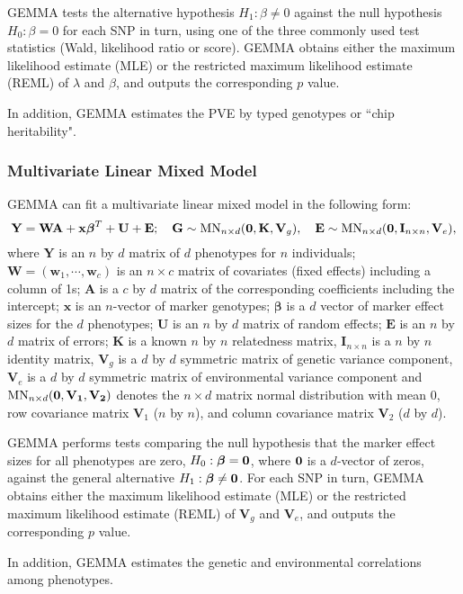 \documentclass[11pt]{article}
\newcommand{\bx}{\mathbf{x}}
\newcommand{\bw}{\mathbf{w}}
\newcommand{\bK}{\mathbf{K}}
\newcommand{\bV}{\mathbf{V}}
\newcommand{\bA}{\mathbf{A}}
\newcommand{\bY}{\mathbf{Y}}
\newcommand{\bE}{\mathbf{E}}
\newcommand{\bG}{\mathbf{G}}
\newcommand{\bW}{\mathbf{W}}
\newcommand{\bU}{\mathbf{U}}
\newcommand{\bI}{\mathbf{I}}
\newcommand{\bbeta}{\boldsymbol\beta}
\begin{document}
GEMMA tests the alternative hypothesis $H_1: \beta\neq 0$ against the null hypothesis $H_0: \beta=0$ for each SNP in turn, using one of the three commonly used test statistics (Wald, likelihood ratio or score). GEMMA obtains either the maximum likelihood estimate (MLE) or the restricted maximum likelihood estimate (REML) of $\lambda$ and $\beta$, and outputs the corresponding $p$ value.

In addition, GEMMA estimates the PVE by typed genotypes or ``chip heritability".


\subsubsection{Multivariate Linear Mixed Model}
GEMMA can fit a multivariate linear mixed model in the following form:
%
\begin{equation*}
\bY=\bW \bA+\bx\bbeta^T+\bU+\bE;  \quad  \bG \sim \mbox{MN}_{n \times d}({\bf 0}, \bK, \bV_g), \quad \bE \sim \mbox{MN}_{n \times d}({\bf 0}, \bI_{n\times n}, \bV_e),
\end{equation*}
%
where $\bY$ is an $n$ by $d$ matrix of $d$ phenotypes for $n$ individuals; $\bW=(\bw_1, \cdots, \bw_c)$ is an $n\times c$ matrix of covariates (fixed effects) including a column of 1s; $\bA$ is a $c$ by $d$ matrix of the corresponding coefficients including the intercept; $\bx$ is an $n$-vector of marker genotypes; $\bbeta$ is a $d$ vector of marker effect sizes for the $d$ phenotypes; $\bU$ is an $n$ by $d$ matrix of random effects; $\bE$ is an $n$ by $d$ matrix of errors; $\bK$ is a known $n$ by $n$ relatedness matrix, $\bI_{n\times n}$ is a $n$ by $n$ identity matrix, $\bV_g$ is a $d$ by $d$  symmetric matrix of genetic variance component, $\bV_e$ is a $d$ by $d$  symmetric matrix of environmental variance component and $\mbox{MN}_{n \times d}(\bf{0}, \bV_1, \bV_2)$ denotes the $n \times d$ matrix normal distribution with mean 0, row covariance matrix $\bV_1$ ($n$ by $n$), and column covariance matrix $\bV_2$ ($d$ by $d$). 

GEMMA performs tests comparing the null hypothesis that the marker effect sizes for all phenotypes are zero, $H_0: \bbeta= \bf 0$, where $\bf 0$ is a $d$-vector of zeros, against the general alternative $H_1: \bbeta\neq \bf 0$. For each SNP in turn, GEMMA obtains either the maximum likelihood estimate (MLE) or the restricted maximum likelihood estimate (REML) of $\bV_g$ and $\bV_e$, and outputs the corresponding $p$ value.

In addition, GEMMA estimates the genetic and environmental correlations among phenotypes.
\end{document}
